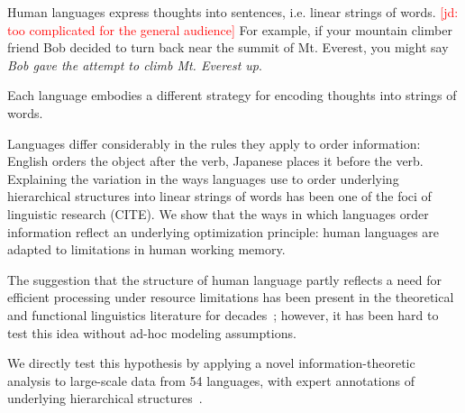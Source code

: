 \documentclass[11pt,letterpaper]{article}
\newcommand{\jd}[1]{\textcolor{Red}{[jd: #1]}}
\begin{document}

Human languages express thoughts into sentences, i.e. linear strings of words. \jd{too complicated for the general audience}
For example, if your mountain climber friend Bob decided to turn back near the summit of Mt. Everest, you might say \emph{Bob gave the attempt to climb Mt. Everest up}.

Each language embodies a different strategy for encoding thoughts into strings of words. 

Languages differ considerably in the rules they apply to order information: English orders the object after the verb, Japanese places it before the verb.
Explaining the variation in the ways languages use to order underlying hierarchical structures into linear strings of words has been one of the foci of linguistic research (CITE).
We show that the ways in which languages order information reflect an underlying optimization principle: human languages are adapted to limitations in human working memory.

The suggestion that the structure of human language partly reflects a need for efficient processing under resource limitations has been present in the theoretical and functional linguistics literature for decades~\citep{berwick1984grammatical,hawkins1994performance};
however, it has been hard to test this idea without ad-hoc modeling assumptions.

We directly test this hypothesis by applying a novel information-theoretic analysis to large-scale data from 54 languages, with expert annotations of underlying hierarchical structures~\citep{nivre-universal-2017}.
\end{document}
